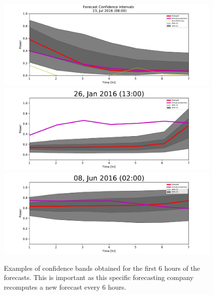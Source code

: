 \documentclass[10pt,twocolumn,letterpaper]{article}
\begin{document}
\begin{figure}[t]
\begin{center}
   \includegraphics[width=0.9\linewidth]{6hr_forecast_CI_618.pdf}
   \includegraphics[width=0.9\linewidth]{6hr_forecast_CI_38.pdf}
   \includegraphics[width=0.9\linewidth]{6hr_forecast_CI_459.pdf}
\end{center}
   \caption{ Examples of confidence bands obtained for the first 6 hours of the forecasts. This is important as this specific forecasting company recomputes a new forecast every 6 hours.}
\label{fig:6hr}
\end{figure}



\end{document}
